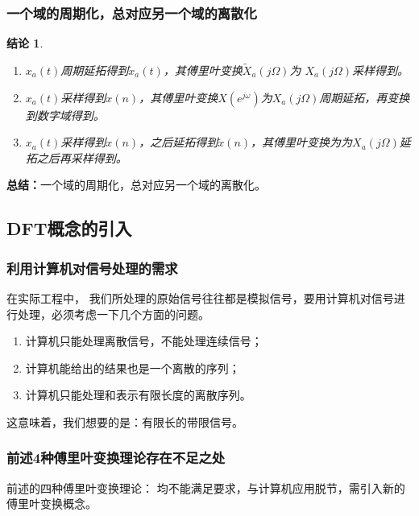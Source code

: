 \documentclass[notheorems,compress,mathserif,table]{beamer}
\newtheorem{jielun}{结论}
\begin{document}
\begin{frame}[shrink]\frametitle{一个域的周期化，总对应另一个域的离散化}%

\begin{jielun}
	\begin{enumerate}
		\item  [(1)]   $ x_a(t) $周期延拓得到$ \tilde{x}_a(t) $，其傅里叶变换$\tilde{X}_a(j\Omega) $为 $X_a(j\Omega) $采样得到。
		\item  [(2)]  $ x_a(t) $采样得到$x(n) $，其傅里叶变换$ X(e^{j\omega}) $为$X_a(j\Omega) $周期延拓，再变换到数字域得到。
		\item  [(3)]   $ x_a(t) $采样得到$x(n) $，之后延拓得到$\tilde{x}(n)$，其傅里叶变换为为$X_a(j\Omega) $延拓之后再采样得到。
	\end{enumerate}
	
\end{jielun}

\textbf{总结：}一个域的周期化，总对应另一个域的离散化。

\end{frame}



\subsection{DFT概念的引入}
\begin{frame}[shrink]\frametitle{利用计算机对信号处理的需求}%
  \par 在实际工程中， 我们所处理的原始信号往往都是模拟信号，要用计算机对信号进行处理，必须考虑一下几个方面的问题。
  \begin{enumerate}
    \item 计算机只能处理离散信号，不能处理连续信号；
    \item 计算机能给出的结果也是一个离散的序列；
    \item 计算机只能处理和表示有限长度的离散序列。
  \end{enumerate}
  这意味着，我们想要的是：有限长的带限信号。%
  \newline\newline\newline\newline\newline

\end{frame}


\begin{frame}[shrink]\frametitle{前述4种傅里叶变换理论存在不足之处}%


  \par 前述的四种傅里叶变换理论：
%
  均不能满足要求，与计算机应用脱节，需引入新的傅里叶变换概念。
\end{frame}
\end{document}
